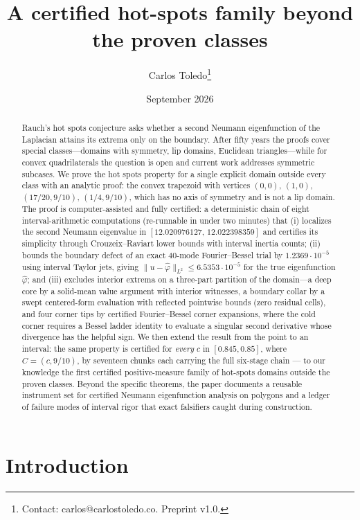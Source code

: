 \documentclass[11pt]{article}
\title{A certified hot-spots family beyond the proven classes}
\author{Carlos Toledo\thanks{Contact: carlos@carlostoledo.co.
Preprint v1.0. %
}}
\date{September 2026}
\newcommand{\norm}[1]{\lVert #1 \rVert}
\newcommand{\phih}{\hat\varphi}
\begin{document}
\maketitle

\begin{abstract}
Rauch's hot spots conjecture asks whether a second Neumann eigenfunction
of the Laplacian attains its extrema only on the boundary. After fifty
years the proofs cover special classes---domains with symmetry, lip
domains, Euclidean triangles---while for convex quadrilaterals the
question is open and current work addresses symmetric subcases. We prove
the hot spots property for a single explicit domain outside every class
with an analytic proof: the convex trapezoid with vertices $(0,0)$,
$(1,0)$, $(17/20,9/10)$, $(1/4,9/10)$, which has no axis of symmetry and
is not a lip domain. The proof is computer-assisted and fully certified:
a deterministic chain of eight interval-arithmetic computations
(re-runnable in under two minutes) that (i) localizes the second
Neumann eigenvalue in $[12.020976127,\,12.022398359]$ and certifies its
simplicity through Crouzeix--Raviart lower bounds with interval inertia
counts; (ii) bounds the boundary defect of an exact 40-mode
Fourier--Bessel trial by $1.2369\cdot10^{-5}$ using interval Taylor jets,
giving $\norm{u-\phih}_{L^2}\le 6.5353\cdot10^{-5}$ for the true
eigenfunction $\phih$; and (iii) excludes interior extrema on a
three-part partition of the domain---a deep core by a solid-mean value
argument with interior witnesses, a boundary collar by a swept
centered-form evaluation with reflected pointwise bounds (zero residual
cells), and four corner tips by certified Fourier--Bessel corner
expansions, where the cold corner requires a Bessel ladder identity to
evaluate a singular second derivative whose divergence has the helpful
sign. We then extend the result from the point to an
interval: the same property is certified for \emph{every} $c$ in
$[0.845,0.85]$, where $C=(c,9/10)$, by seventeen chunks each carrying
the full six-stage chain --- to our knowledge the first certified
positive-measure family of hot-spots domains outside the proven classes.
Beyond the specific theorems, the paper documents a reusable
instrument set for certified Neumann eigenfunction analysis on polygons
and a ledger of failure modes of interval rigor that exact
falsifiers caught during construction.
\end{abstract}

\section{Introduction}
\end{document}
